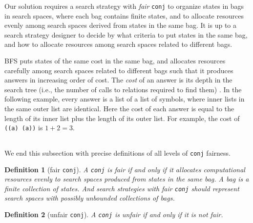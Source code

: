 \documentclass[format=acmlarge, review=true, authordraft=true]{acmart}
\newcommand{\conj}{\texttt{conj}}
\newcommand{\BFS}[0]{BFS}
\newtheorem{defn}{Definition}[section]
\begin{document}
Our solution requires a search strategy with \emph{fair} \conj{} to organize
states in bags in search spaces, where each bag contains finite states, and 
to allocate resources evenly among search spaces derived from states in the 
same bag. It is up to a search strategy designer to decide by what criteria to 
put states in the same bag, and how to allocate resources among search spaces 
related to different bags.

\BFS{} puts states of the same cost in the same bag, and allocates
resources carefully among search spaces related to different bags such
that it produces answers in increasing order of cost. The \emph{cost}
of an answer is its depth in the search tree (i.e., the number of
calls to relations required to find them) \citep{seres1999algebra}. In
the following example, every answer is a list of a list of symbols,
where inner lists in the same outer list are identical. Here the cost of each 
answer is equal
to the length of its inner list plus the length of its outer list. For example,
the cost of \texttt{((a) (a))} is $1 + 2 = 3$.


\begin{center}
	\begin{tabular}{c}
		
	\end{tabular}
\end{center}

We end this subsection with precise definitions of all levels of \conj{} 
fairness.

\begin{defn}[fair \conj{}]
A \conj{} is fair if and only if it allocates computational resources evenly to 
search spaces produced from states in the same bag. A bag is a finite 
collection of states. And search strategies with fair \conj{} should represent 
search spaces with possibly unbounded collections of bags. 
\end{defn}

\begin{defn}[unfair \conj{}]
A \conj{} is unfair if and only if it is not fair.
\end{defn}
\end{document}
